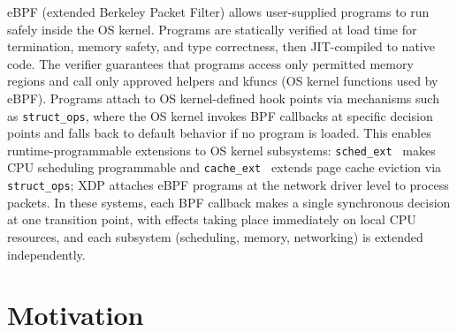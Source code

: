 eBPF (extended Berkeley Packet Filter) allows user-supplied programs to run safely inside the OS kernel. Programs are statically verified at load time for termination, memory safety, and type correctness, then JIT-compiled to native code. The verifier guarantees that programs access only permitted memory regions and call only approved helpers and kfuncs (OS kernel functions used by eBPF). Programs attach to OS kernel-defined hook points via mechanisms such as \texttt{struct\_ops}, where the OS kernel invokes BPF callbacks at specific decision points and falls back to default behavior if no program is loaded. This enables runtime-programmable extensions to OS kernel subsystems: \texttt{sched\_ext}~\cite{schedext-docs} makes CPU scheduling programmable and \texttt{cache\_ext}~\cite{zussman2025cache_ext} extends page cache eviction via \texttt{struct\_ops}; XDP attaches eBPF programs at the network driver level to process packets. In these systems, each BPF callback makes a single synchronous decision at one transition point, with effects taking place immediately on local CPU resources, and each subsystem (scheduling, memory, networking) is extended independently.

\section{Motivation}

